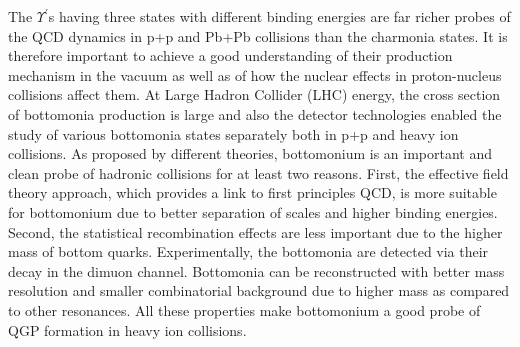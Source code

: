 The $\Upsilon^{'}$s having three states with different binding
energies are far richer probes of the QCD dynamics in p+p and Pb+Pb collisions than
the charmonia states.
It is therefore important to achieve a good understanding of their
production mechanism in the vacuum as well as of how the nuclear effects in proton-nucleus
collisions affect them.
  At Large Hadron Collider (LHC) energy, the cross section of bottomonia production
is large and also the detector technologies enabled the study of various bottomonia 
states separately both in p+p and heavy ion collisions.
As proposed by different theories, bottomonium is an important and clean probe 
of hadronic collisions for at least two reasons. 
First, the effective field theory approach, which provides a link to first 
principles QCD, is more suitable for bottomonium due to better separation of 
scales and higher binding energies. Second, the statistical recombination effects 
are less important due to the higher mass of bottom quarks.  
Experimentally, the bottomonia are detected via their decay in the dimuon channel.
Bottomonia can be reconstructed with better mass resolution and smaller
combinatorial background due to higher mass as compared to other resonances. 
 All these properties make bottomonium a good probe of QGP formation in heavy ion collisions.


